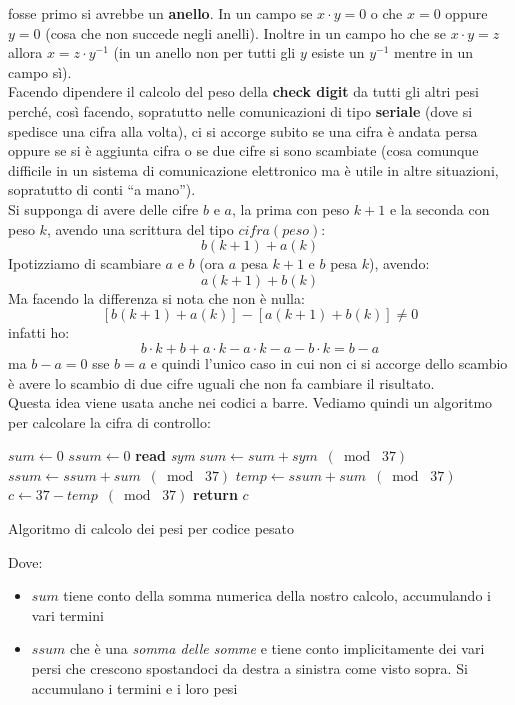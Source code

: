 \documentclass[a4paper,12pt, oneside]{book}
\begin{document}
fosse primo si avrebbe un \textbf{anello}. In un campo se $x\cdot y=0$ o che
$x=0$ oppure $y=0$ (cosa che non succede negli anelli). Inoltre in un campo ho
che se $x\cdot y =z$ allora $x=z\cdot y^{-1}$ (in un anello non per tutti gli
$y$ esiste un $y^{-1}$ mentre in un campo sì).\\
Facendo dipendere il calcolo del peso della \textbf{check digit} da tutti gli
altri pesi perché, così facendo, sopratutto nelle comunicazioni di tipo
\textbf{seriale} (dove si spedisce una cifra alla volta), ci si accorge subito
se una cifra è andata persa oppure se si è aggiunta cifra o se due cifre si
sono scambiate (cosa comunque difficile in un sistema di comunicazione
elettronico ma è utile in altre situazioni, sopratutto di conti ``a
mano'').\\
Si supponga di avere delle cifre $b$ e $a$, la prima con peso $k+1$ e la
seconda con peso $k$, avendo una scrittura del tipo $cifra(peso)$:
\[b(k+1)+a(k)\]
Ipotizziamo di scambiare $a$ e $b$ (ora $a$ pesa $k+1$ e $b$ pesa $k$),
avendo:
\[a(k+1)+b(k)\]
Ma facendo la differenza si nota che non è nulla:
\[[b(k+1)+a(k)]-[a(k+1)+b(k)]\neq 0\]
infatti ho:
\[b\cdot k+b+a\cdot k-a\cdot k-a-b\cdot k=b-a\]
ma $b-a=0$ sse $b=a$ e quindi l'unico caso in cui non ci si accorge dello
scambio è avere lo scambio di due cifre uguali che non fa cambiare il
risultato.\\
Questa idea viene usata anche nei codici a barre. Vediamo quindi un algoritmo
per calcolare la cifra di controllo:
\begin{algorithm}[H]
  \begin{algorithmic}
    \State $sum \gets 0$
    \State $ssum \gets 0$
    \State \textbf{read} \textit{sym}
    \State $sum \gets sum+sym\,\,\, (\bmod\,\, 37)$
    \State $ssum \gets ssum+sum\,\,\, (\bmod\,\, 37)$
    \EndWhile
    \State $temp \gets ssum+sum\,\,\, (\bmod\,\, 37)$
    \State $c \gets 37-temp\,\,\, (\bmod\,\, 37)$
    \State \textbf{return} $c$ 
    \EndFunction
  \end{algorithmic}
  \caption{Algoritmo di calcolo dei pesi per codice pesato}
\end{algorithm}
Dove:
\begin{itemize}
  \item $sum$ tiene conto della somma numerica della nostro calcolo, accumulando
  i vari termini 
  \item $ssum$ che è una \textit{somma delle somme} e tiene conto implicitamente
  dei vari persi che crescono spostandoci da destra a sinistra come visto
  sopra. Si accumulano i termini e i loro pesi
\end{itemize}
\end{document}
